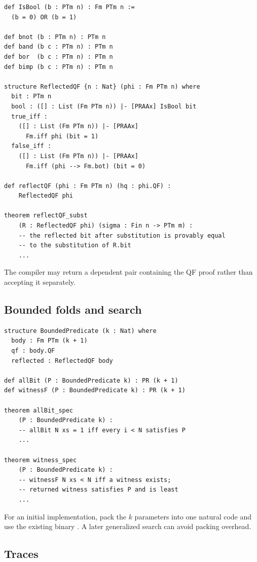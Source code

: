 \begin{lstlisting}[language={}]
def IsBool (b : PTm n) : Fm PTm n :=
  (b = 0) OR (b = 1)

def bnot (b : PTm n) : PTm n
def band (b c : PTm n) : PTm n
def bor  (b c : PTm n) : PTm n
def bimp (b c : PTm n) : PTm n

structure ReflectedQF {n : Nat} (phi : Fm PTm n) where
  bit : PTm n
  bool : ([] : List (Fm PTm n)) |- [PRAAx] IsBool bit
  true_iff :
    ([] : List (Fm PTm n)) |- [PRAAx]
      Fm.iff phi (bit = 1)
  false_iff :
    ([] : List (Fm PTm n)) |- [PRAAx]
      Fm.iff (phi --> Fm.bot) (bit = 0)

def reflectQF (phi : Fm PTm n) (hq : phi.QF) :
    ReflectedQF phi

theorem reflectQF_subst
    (R : ReflectedQF phi) (sigma : Fin n -> PTm m) :
    -- the reflected bit after substitution is provably equal
    -- to the substitution of R.bit
    ...
\end{lstlisting}

The compiler may return a dependent pair containing the QF proof rather than
accepting it separately.

\subsection{Bounded folds and search}

\begin{lstlisting}[language={}]
structure BoundedPredicate (k : Nat) where
  body : Fm PTm (k + 1)
  qf : body.QF
  reflected : ReflectedQF body

def allBit (P : BoundedPredicate k) : PR (k + 1)
def witnessF (P : BoundedPredicate k) : PR (k + 1)

theorem allBit_spec
    (P : BoundedPredicate k) :
    -- allBit N xs = 1 iff every i < N satisfies P
    ...

theorem witness_spec
    (P : BoundedPredicate k) :
    -- witnessF N xs < N iff a witness exists;
    -- returned witness satisfies P and is least
    ...
\end{lstlisting}

For an initial implementation, pack the \(k\) parameters into one natural code
and use the existing binary .  A later generalized search can
avoid packing overhead.

\subsection{Traces}

